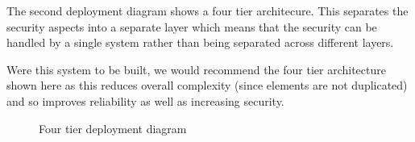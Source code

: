 \documentclass[a4paper]{article}
\begin{document}
The second deployment diagram shows a four tier architecure. This separates the
security aspects into a separate layer which means that the security can be
handled by a single system rather than being separated across different layers.

Were this system to be built, we would recommend the four tier architecture
shown here as this reduces overall complexity (since elements are not
duplicated) and so improves reliability as well as increasing security.

\begin{figure}[h!]
	\centering
	\caption{Four tier deployment diagram}
\end{figure}
\clearpage
\end{document}
